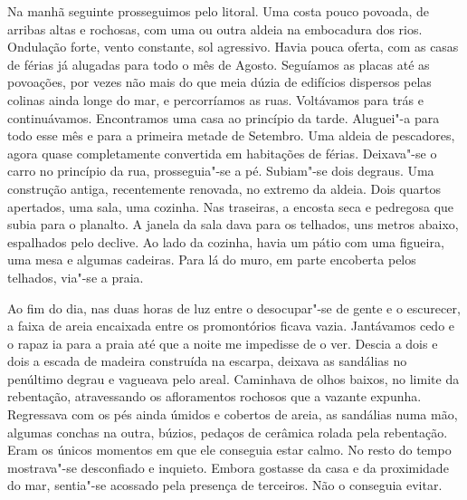 Na manhã seguinte prosseguimos pelo litoral. Uma costa pouco povoada, de
arribas altas e rochosas, com uma ou outra aldeia na embocadura dos
rios. Ondulação forte, vento constante, sol agressivo. Havia pouca
oferta, com as casas de férias já alugadas para todo o mês de Agosto.
Seguíamos as placas até as povoações, por vezes não mais do que meia
dúzia de edifícios dispersos pelas colinas ainda longe do mar, e
percorríamos as ruas. Voltávamos para trás e continuávamos. Encontramos
uma casa ao princípio da tarde. Aluguei"-a para todo esse mês e para a
primeira metade de Setembro. Uma aldeia de pescadores, agora quase
completamente convertida em habitações de férias. Deixava"-se o carro no
princípio da rua, prosseguia"-se a pé. Subiam"-se dois degraus. Uma
construção antiga, recentemente renovada, no extremo da aldeia. Dois
quartos apertados, uma sala, uma cozinha. Nas traseiras, a encosta seca
e pedregosa que subia para o planalto. A janela da sala dava para os
telhados, uns metros abaixo, espalhados pelo declive. Ao lado da
cozinha, havia um pátio com uma figueira, uma mesa e algumas cadeiras.
Para lá do muro, em parte encoberta pelos telhados, via"-se a praia.

Ao fim do dia, nas duas horas de luz entre o desocupar"-se de gente e o
escurecer, a faixa de areia encaixada entre os promontórios ficava
vazia. Jantávamos cedo e o rapaz ia para a praia até que a noite me
impedisse de o ver. Descia a dois e dois a escada de madeira construída
na escarpa, deixava as sandálias no penúltimo degrau e vagueava pelo
areal. Caminhava de olhos baixos, no limite da rebentação, atravessando
os afloramentos rochosos que a vazante expunha. Regressava com os pés
ainda úmidos e cobertos de areia, as sandálias numa mão, algumas
conchas na outra, búzios, pedaços de cerâmica rolada pela rebentação.
Eram os únicos momentos em que ele conseguia estar calmo. No resto do
tempo mostrava"-se desconfiado e inquieto. Embora gostasse da casa e da
proximidade do mar, sentia"-se acossado pela presença de terceiros. Não
o conseguia evitar.

